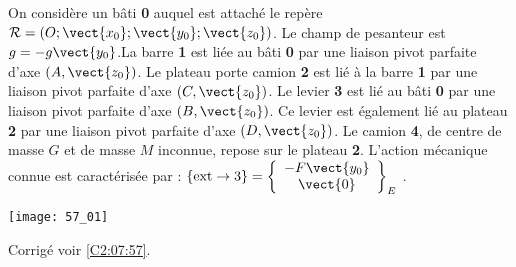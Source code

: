 \normalfalse \difficiletrue \tdifficilefalse
\correctionfalse


\setcounter{question}{0}
\ifcorrection
\else
{}
\fi

\ifprof
\else
On considère un bâti \textbf{0} auquel est attaché le repère$\mathcal{R}=\left(O;\vect{x_0};\vect{y_0};\vect{z_0} \right)$. Le champ de pesanteur est $g=-g\vect{y_0}$.La barre \textbf{1} est liée au bâti \textbf{0} par une liaison pivot parfaite d’axe $\left(A,\vect{z_0}\right)$. Le plateau porte camion \textbf{2} est lié à la barre \textbf{1} par une liaison pivot parfaite d’axe $\left(C,\vect{z_0}\right)$. Le levier \textbf{3} est lié au bâti \textbf{0} par une liaison pivot parfaite d’axe $\left(B,\vect{z_0}\right)$. Ce levier est également lié au plateau \textbf{2} par une liaison pivot parfaite d’axe $\left(D,\vect{z_0}\right)$. Le camion \textbf{4}, de centre de masse $G$ et de masse $M$ inconnue, repose sur le plateau \textbf{2}.
L’action mécanique connue est caractérisée par : $\{\text{ext}\rightarrow 3\}=\left\{
\begin{array}{c}
-F\vect{y_0} \\
\vect{0} \\
\end{array}
\right\}_E$ .


\begin{center}
\texttt{[image: 57\_01]}
\end{center}


\fi

\ifprof
\else
\fi



\ifprof
\else
\fi
\ifprof
\else
\begin{flushright}
\footnotesize{Corrigé  voir \ref{C2:07:57}.}
\end{flushright}%
\fi